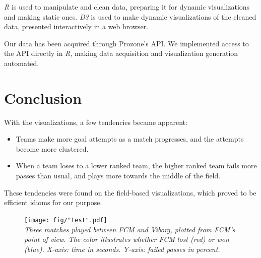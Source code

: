 \documentclass[portrait, a0,30pt]{sciposter}
\begin{document}
\begin{multicols}{2}
\begin{mdframed}
\emph{R} is used to manipulate and clean data, preparing it for dynamic visualizations and making static ones. \emph{D3} is used to make dynamic visualizations of the cleaned data, presented interactively in a web browser.

\hspace{30pt}Our data has been acquired through Prozone's API. We implemented access to the API directly in \emph{R}, making data acquisition and visualization generation automated.

\end{mdframed}

\section*{Conclusion}
\begin{mdframed}
With the visualizations, a few tendencies became apparent:
\begin{itemize}
\item \hspace{10pt} Teams make more goal attempts as a match progresses, and the attempts become more clustered.
\item \hspace{10pt} When a team loses to a lower ranked team, the higher ranked team fails more passes than usual, and plays more towards the middle of the field.
\end{itemize}
These tendencies were found on the field-based visualizations, which proved to be efficient idioms for our purpose.
\end{mdframed}

\begin{mdframed}[]
\begin{figure}
	\center
	\texttt{[image: fig/"test".pdf]}
	\\
	\textit{Three matches played between FCM and Viborg, plotted from FCM's point of view. The color illustrates whether FCM lost (red) or won (blue). X-axis: time in seconds. Y-axis: failed passes in percent.}
\end{figure}
\end{mdframed}


\end{multicols}
\end{document}
